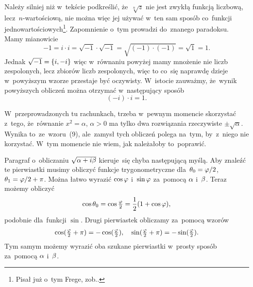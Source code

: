 \documentclass[a4paper,11pt]{article}
\begin{document}
\start {} Należy silniej niż w~tekście podkreślić,
że~$\sqrt[n]{ z }$ nie jest zwykłą funkcją liczbową,
lecz~$n$-wartościową, nie można więc jej używać w~ten sam sposób
co~funkcji jednowartościowych\footnote{Pisał już o~tym Frege,
  zob..}. Zapomnienie o~tym prowadzi do~znanego
paradoksu. Mamy mianowicie
\begin{equation}
  \label{eq:Leja-07}
  -1 = i \cdot i = \sqrt{ -1 } \cdot \sqrt{ -1 }
  = \sqrt{ ( -1 ) \cdot ( -1 ) } = \sqrt{ 1 } = 1.
\end{equation}
Jednak $\sqrt{ -1 } = \{  i, -i  \}$ więc w~równaniu powyżej mamy
mnożenie nie liczb zespolonych, lecz zbiorów liczb zespolonych, więc
to co~się naprawdę dzieje w~powyższym wzorze przestaje być oczywisty.
W~istocie zauważmy, że~wynik powyższych obliczeń można otrzymać
w~następujący sposób
\begin{equation}
  \label{eq:Leja-08}
  ( -i ) \cdot i = 1.
\end{equation}

\vspace{\spaceFour}


\start {} W~przeprowadzonych tu rachunkach, trzeba w~pewnym
momencie skorzystać z~tego, że~równanie $x^{ 2 } = \alpha$,
$\alpha > 0$ ma tylko dwa rozwiązania rzeczywiste
$\pm \sqrt{ \alpha }$. Wynika to~ze~wzoru~(9), ale~zamysł tych
obliczeń polega na~tym, by~z~niego nie korzystać. W~tym momencie nie
wiem, jak należałoby to~poprawić.

\vspace{\spaceFour}


\start {} Paragraf o~obliczaniu $\sqrt{ \alpha + i \beta }$
kieruje~się chyba następującą myślą. Aby znaleźć te pierwiastki musimy
obliczyć funkcje trygonometryczne dla~$\theta_{ 0 } = \varphi / 2$,
$\theta_{ 1 } = \varphi / 2 + \pi$. Można łatwo wyrazić $\cos \varphi$
i~$\sin \varphi$ za~pomocą $\alpha$ i~$\beta$. Teraz możemy obliczyć
\begin{equation}
  \label{eq:Leja-09}
  \begin{split}
    \cos \theta_{ 0 } = \cos \tfrac{ \varphi }{ 2 } = \frac{ 1 }{ 2 } ( 1 + \cos
    \varphi ),
  \end{split}
\end{equation}
podobnie dla~funkcji $\sin$. Drugi pierwiastek obliczamy za~pomocą
wzorów
\begin{equation}
  \label{eq:Leja-10}
  \begin{split}
    \cos( \tfrac{ \varphi }{ 2 } + \pi ) = -\cos( \tfrac{ \varphi }{ 2 } ), \quad
    \sin( \tfrac{ \varphi }{ 2 } + \pi ) = -\sin( \tfrac{ \varphi }{ 2 } ).
  \end{split}
\end{equation}
Tym samym możemy wyrazić oba szukane pierwiastki w~prosty sposób
za~pomocą $\alpha$ i~$\beta$.
\end{document}
